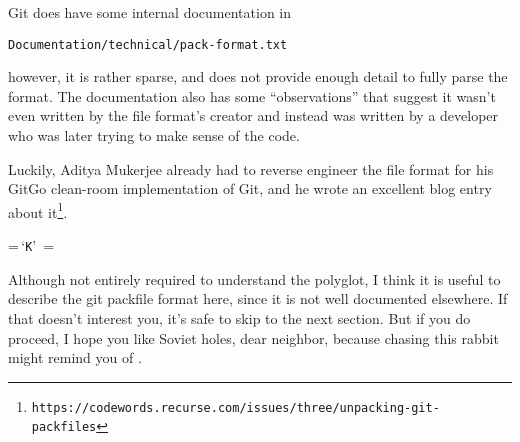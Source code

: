 \documentclass{article}
\begin{document}
Git does have some internal documentation in
\begin{center}
  \texttt{Documentation/technical/pack-format.txt}
\end{center}
however, it is rather sparse, and does not provide enough detail to
fully parse the format. The documentation also has some
``observations'' that suggest it wasn't even written by the file
format's creator and instead was written by a developer who was later
trying to make sense of the code.

Luckily, Aditya Mukerjee already had to reverse engineer the file
format for his GitGo clean-room implementation of Git, and he wrote an
excellent blog entry about
it\footnote{\texttt{https://codewords.recurse.com/issues/three/unpacking-git-packfiles}}.

\begin{center}
{\small
\def\char#1{\,`\texttt{#1}'\,}
=\hbox{\char{K}}
\newdimen\bytewidth\bytewidth=
\def\byte#1{\hbox to \bytewidth{\hfil\texttt{#1}\hfil}}
\def\desc#1#2{\hbox to #1\bytewidth{\hfil #2\hfil}}
\def\underbrace#1{\draw [
    thick,
    decoration={
        brace,
        mirror,
        raise=2pt
    },
    decorate
] ([xshift=1pt]#1.base west) -- ([xshift=-1pt]#1.base east) 
node (#1label) [pos=0.5,anchor=north,yshift=-2pt]}
}
\end{center}

Although not entirely required to understand the polyglot, I think it
is useful to describe the git packfile format here, since it is not
well documented elsewhere. If that doesn't interest you, it's safe to
skip to the next section.  But if you do proceed, I hope you like
Soviet holes, dear neighbor, because chasing this rabbit might remind
you of .
\end{document}

